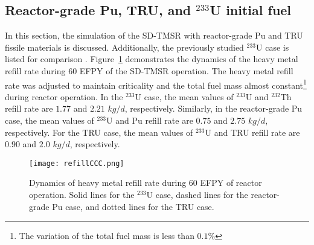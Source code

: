 \subsection{Reactor-grade Pu, TRU, and $^{233}$U initial fuel}
In this section, the simulation of the SD-TMSR with reactor-grade Pu and TRU 
fissile materials is discussed. Additionally, the previously studied $^{233}$U 
case is listed for comparison \cite{ashraf2019whole_core}. 
Figure~\ref{fig:refillCCC} demonstrates the dynamics of the heavy metal refill 
rate during 60 \gls{EFPY} of the SD-TMSR operation. The heavy metal refill 
rate was adjusted to maintain criticality and the total fuel mass 
almost constant\footnote{The variation of the total fuel mass is less than 
$0.1\%$} during reactor operation. In the $^{233}$U case, the mean values of 
$^{233}$U and $^{232}$Th refill rate are $1.77$ and $2.21$ $kg/d$, 
respectively. Similarly, in the reactor-grade Pu case, the mean values of 
$^{233}$U and Pu refill rate are $0.75$ and $2.75$ $kg/d$, respectively. For  
the TRU case, the mean values of $^{233}$U and TRU refill rate are $0.90$ and 
$2.0$ $kg/d$, respectively.
\begin{figure}
	\centering
	\texttt{[image: refillCCC.png]}
			\vspace{-0.5in}
	\caption{Dynamics of heavy metal refill rate during 60 \gls{EFPY} of 
		reactor operation. Solid lines for the $^{233}$U case, dashed lines for the
		reactor-grade Pu case, and dotted lines for the TRU case.}
	\label{fig:refillCCC}
\end{figure}

